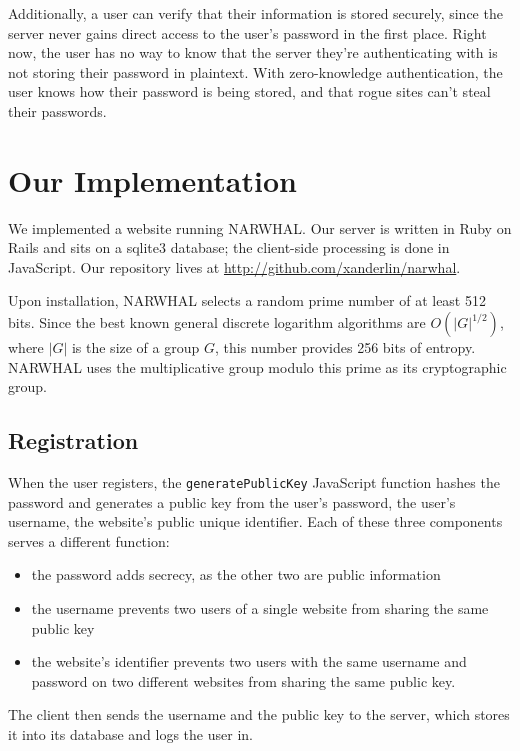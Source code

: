 \documentclass[11pt]{article}
\begin{document}
Additionally, a user can verify that their information is stored securely, since the server never gains direct access to the user’s password in the first place.  Right now, the user has no way to know that the server they’re authenticating with is not storing their password in plaintext.  With zero-knowledge authentication, the user knows how their password is being stored, and that rogue sites can’t steal their passwords.

\section{Our Implementation}

We implemented a website running NARWHAL. Our server is written in Ruby on Rails and sits on a sqlite3 database; the client-side processing is done in JavaScript. Our repository lives at \url{http://github.com/xanderlin/narwhal}.

Upon installation, NARWHAL selects a random prime number of at least 512 bits.  Since the best known general discrete logarithm algorithms are $O(|G|^{1/2})$, where $|G|$ is the size of a group $G$, this number provides 256 bits of entropy.\cite{Adleman}  NARWHAL uses the multiplicative group modulo this prime as its cryptographic group.

\subsection{Registration}

When the user registers, the \texttt{generatePublicKey} JavaScript function hashes the password and generates a public key from the user’s password, the user’s username, the website’s public unique identifier. Each of these three components serves a different function:
\begin{itemize}
  \item the password adds secrecy, as the other two are public information
  \item the username prevents two users of a single website from sharing the same public key
  \item the website’s identifier prevents two users with the same username and password on two different websites from sharing the same public key.
\end{itemize}

The client then sends the username and the public key to the server, which stores it into its database and logs the user in.
\end{document}

